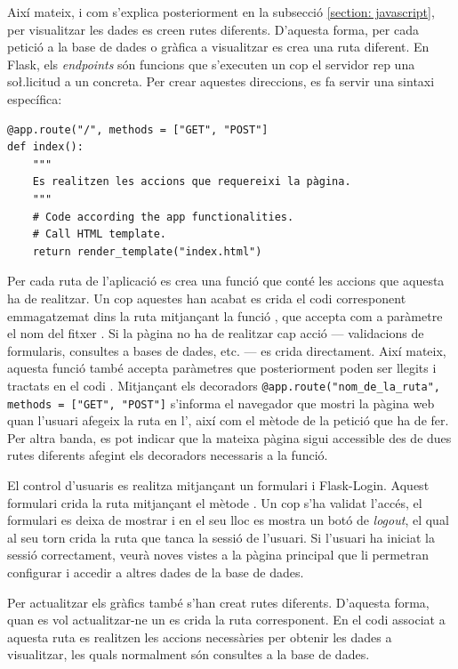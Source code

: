 \documentclass{tfgitic}[2022/06/30]
\begin{document}
Així mateix, i com s'explica posteriorment en la subsecció \ref{section: javascript}, per visualitzar les dades es creen rutes diferents. D'aquesta forma, per cada petició a la base de dades o gràfica a visualitzar es crea una ruta diferent. En Flask, els \emph{endpoints} són funcions que s'executen un cop el servidor rep una so\l.licitud a un  concreta. Per crear aquestes direccions, es fa servir una sintaxi específica:

\begin{lstlisting}[style = python]
@app.route("/", methods = ["GET", "POST"]
def index():
    """
    Es realitzen les accions que requereixi la pàgina.
    """
    # Code according the app functionalities.
    # Call HTML template.
    return render_template("index.html")
\end{lstlisting}

Per cada ruta de l'aplicació es crea una funció que conté les accions que aquesta ha de realitzar. Un cop aquestes han acabat es crida el codi  corresponent emmagatzemat dins la ruta  mitjançant la funció , que accepta com a paràmetre el nom del fitxer . Si la pàgina no ha de realitzar cap acció --- validacions de formularis, consultes a bases de dades, etc. --- es crida directament. Així mateix, aquesta funció també accepta paràmetres que posteriorment poden ser llegits i tractats en el codi . Mitjançant els decoradors \texttt{@app.route("nom\_de\_la\_ruta", methods = ["GET", "POST"]} s'informa el navegador que mostri la pàgina web  quan l'usuari afegeix la ruta \fitx{/} en l', així com el mètode de la petició que ha de fer. Per altra banda, es pot indicar que la mateixa pàgina sigui accessible des de dues rutes diferents afegint els decoradors necessaris a la funció.

El control d'usuaris es realitza mitjançant un formulari i Flask-Login. Aquest formulari crida la ruta  mitjançant el mètode . Un cop s'ha validat l'accés, el formulari es deixa de mostrar i en el seu lloc es mostra un botó de \emph{logout}, el qual al seu torn crida la ruta  que tanca la sessió de l'usuari. Si l'usuari ha iniciat la sessió correctament, veurà noves vistes a la pàgina principal que li permetran configurar i accedir a altres dades de la base de dades.

Per actualitzar els gràfics també s'han creat rutes diferents. D'aquesta forma, quan es vol actualitzar-ne un es crida la ruta corresponent. En el codi associat a aquesta ruta es realitzen les accions necessàries per obtenir les dades a visualitzar, les quals normalment són consultes a la base de dades.
\end{document}
